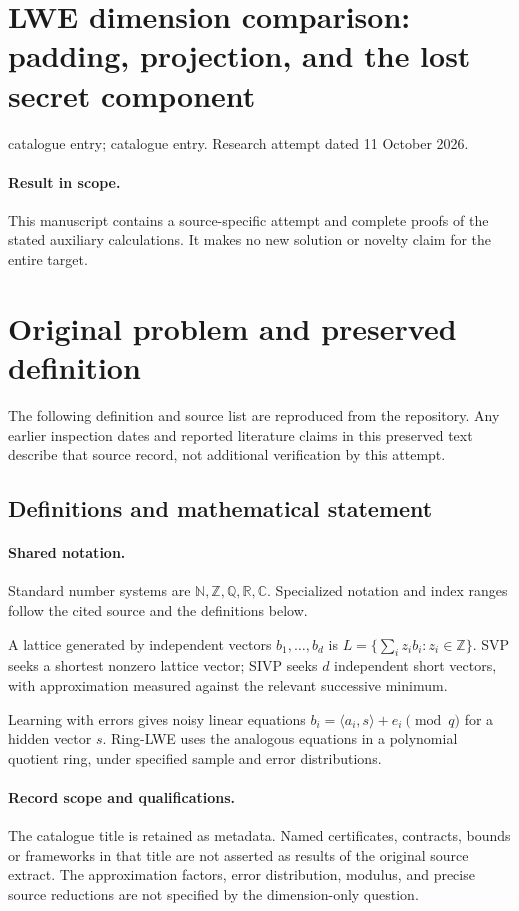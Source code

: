 \documentclass[11pt]{article}
\begin{document}
\section*{LWE dimension comparison: padding, projection, and the lost secret component}
\noindent catalogue entry; catalogue entry. Research attempt dated 11 October 2026.
\paragraph{Result in scope.}This manuscript contains a source-specific attempt and complete proofs of the stated auxiliary calculations. It makes no new solution or novelty claim for the entire target.
\section{Original problem and preserved definition}
The following definition and source list are reproduced from the repository. Any earlier inspection dates and reported literature claims in this preserved text describe that source record, not additional verification by this attempt.
\subsection{Definitions and mathematical statement}

\paragraph{Shared notation.}Standard number systems are $\mathbb N,\mathbb Z,\mathbb Q,\mathbb R,\mathbb C$. Specialized notation and index ranges follow the cited source and the definitions below.


A lattice generated by independent vectors $b_1,\ldots,b_d$ is $L=\{\sum_i z_i b_i:z_i\in\mathbb Z\}$. SVP seeks a shortest nonzero lattice vector; SIVP seeks $d$ independent short vectors, with approximation measured against the relevant successive minimum.

Learning with errors gives noisy linear equations $b_i=\langle a_i,s\rangle+e_i\pmod q$ for a hidden vector $s$. Ring-LWE uses the analogous equations in a polynomial quotient ring, under specified sample and error distributions.
\paragraph{Record scope and qualifications.}
The catalogue title is retained as metadata. Named certificates, contracts, bounds or frameworks in that title are not asserted as results of the original source extract.
The approximation factors, error distribution, modulus, and precise source reductions are not specified by the dimension-only question.
\end{document}
